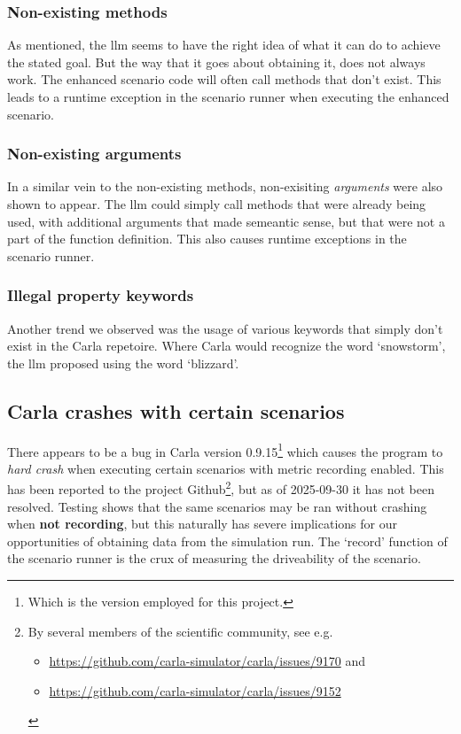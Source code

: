\subsubsection{Non-existing methods}

As mentioned, the \acrshort{llm} seems to have the right idea of what it can do
to achieve the stated goal. But the way that it goes about obtaining it, does
not always work. The enhanced scenario code will often call methods that don't
exist. This leads to a runtime exception in the scenario runner when executing
the enhanced scenario. 

\subsubsection{Non-existing arguments}

In a similar vein to the non-existing methods, non-exisiting \emph{arguments}
were also shown to appear. The \acrshort{llm} could simply call methods that
were already being used, with additional arguments that made semeantic sense,
but that were not a part of the function definition. This also causes runtime
exceptions in the scenario runner.

\subsubsection{Illegal property keywords}

Another trend we observed was the usage of various keywords that simply don't
exist in the Carla repetoire. Where Carla would recognize the word `snowstorm',
the \acrfull{llm} proposed using the word `blizzard'.



\subsection{Carla crashes with certain scenarios}

There appears to be a bug in Carla version 0.9.15\footnote{Which is the version
employed for this project.} which causes the program to \emph{hard crash} when
executing certain scenarios with metric recording enabled. This has been
reported to the project Github\footnote{By several members of the scientific community, see e.g.
\begin{itemize}\item  \url{https://github.com/carla-simulator/carla/issues/9170} and \item \url{https://github.com/carla-simulator/carla/issues/9152}\end{itemize}}, but as of 2025-09-30 it has not been resolved.
Testing shows that the same scenarios may be ran without crashing when
\textbf{not recording}, but this naturally has severe implications for our
opportunities of obtaining data from the simulation run. The `record' function
of the scenario runner is the crux of measuring the driveability of the
scenario. 



